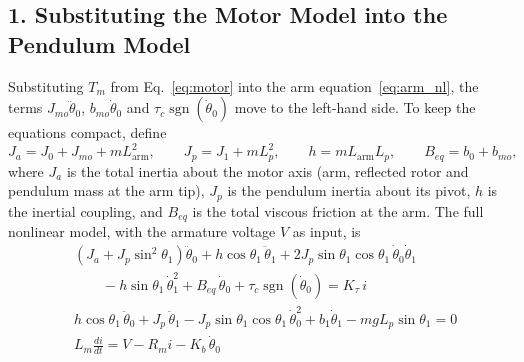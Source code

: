 \documentclass[a4paper,11pt]{article}
\newcommand{\La}{L_{\mathrm{arm}}}
\newcommand{\sgn}{\operatorname{sgn}}
\begin{document}
\subsection{1. Substituting the Motor Model into the Pendulum Model}
Substituting $T_m$ from Eq.~\eqref{eq:motor} into the arm equation~\eqref{eq:arm_nl}, the terms $J_{mo}\ddot\theta_0$, $b_{mo}\dot\theta_0$ and $\tau_c \sgn(\dot\theta_0)$ move to the left-hand side. To keep the equations compact, define
\begin{equation}
  J_a = J_0 + J_{mo} + m \La^2, \qquad J_p = J_1 + m L_p^2, \qquad h = m \La L_p, \qquad B_{eq} = b_0 + b_{mo} ,
  \label{eq:short}
\end{equation}
where $J_a$ is the total inertia about the motor axis (arm, reflected rotor and pendulum mass at the arm tip), $J_p$ is the pendulum inertia about its pivot, $h$ is the inertial coupling, and $B_{eq}$ is the total viscous friction at the arm. The full nonlinear model, with the armature voltage $V$ as input, is
\begin{equation}
\boxed{
\begin{aligned}
  & \left(J_a + J_p \sin^2\theta_1\right)\ddot\theta_0 + h \cos\theta_1\, \ddot\theta_1 + 2 J_p \sin\theta_1 \cos\theta_1\, \dot\theta_0 \dot\theta_1\\
  & \qquad - h \sin\theta_1\, \dot\theta_1^2 + B_{eq}\, \dot\theta_0 + \tau_c \sgn(\dot\theta_0) = K_\tau\, i\\[4pt]
  & h \cos\theta_1\, \ddot\theta_0 + J_p\, \ddot\theta_1 - J_p \sin\theta_1 \cos\theta_1\, \dot\theta_0^2 + b_1 \dot\theta_1 - m g L_p \sin\theta_1 = 0\\[4pt]
  & L_m \frac{di}{dt} = V - R_m i - K_b\, \dot\theta_0
\end{aligned}
}
\label{eq:full_nl}
\end{equation}
\end{document}
